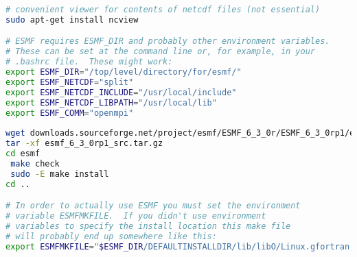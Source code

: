 \documentclass[12pt]{article}
\begin{document}
\begin{lstlisting}[language=bash]
# convenient viewer for contents of netcdf files (not essential)
sudo apt-get install ncview

# ESMF requires ESMF_DIR and probably other environment variables.  
# These can be set at the command line or, for example, in your 
# .bashrc file.  These might work:
export ESMF_DIR="/top/level/directory/for/esmf/"
export ESMF_NETCDF="split"
export ESMF_NETCDF_INCLUDE="/usr/local/include"
export ESMF_NETCDF_LIBPATH="/usr/local/lib"
export ESMF_COMM="openmpi"
                                                                                                              
wget downloads.sourceforge.net/project/esmf/ESMF_6_3_0r/ESMF_6_3_0rp1/esmf_6_3_0rp1_src.tar.gz
tar -xf esmf_6_3_0rp1_src.tar.gz
cd esmf 
 make check
 sudo -E make install
cd ..

# In order to actually use ESMF you must set the environment 
# variable ESMFMKFILE.  If you didn't use environment 
# variables to specify the install location this make file 
# will probably end up somewhere like this:
export ESMFMKFILE="$ESMF_DIR/DEFAULTINSTALLDIR/lib/libO/Linux.gfortran.64.openmpi.default/esmf.mk"


\end{lstlisting}
\end{document}
